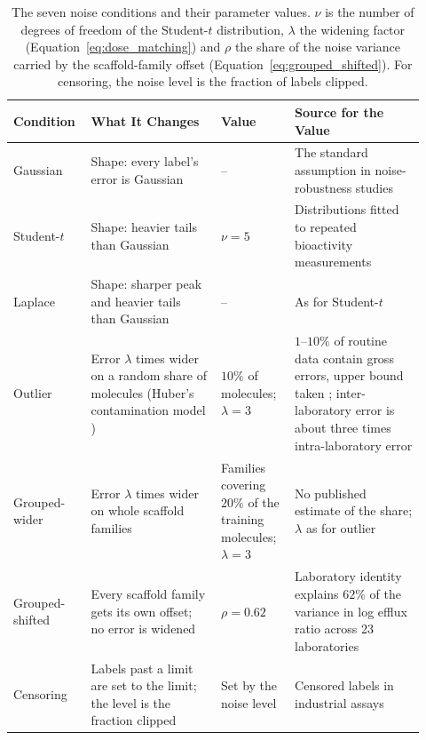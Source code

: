 \begin{table}[htbp]
\centering
\small
\begin{adjustbox}{max width=\textwidth,max totalheight=0.78\textheight}
\begin{tabular}{@{}P{0.15\linewidth}P{0.30\linewidth}P{0.17\linewidth}P{0.30\linewidth}@{}}
\toprule
\textbf{Condition} & \textbf{What It Changes} & \textbf{Value} & \textbf{Source for the Value} \\
\midrule
Gaussian & Shape: every label's error is Gaussian & -- & The standard assumption in noise-robustness studies \\
Student-$t$ & Shape: heavier tails than Gaussian & $\nu = 5$ & Distributions fitted to repeated bioactivity measurements \citep{Kruger2012} \\
Laplace & Shape: sharper peak and heavier tails than Gaussian & -- & As for Student-$t$ \citep{Kruger2012} \\
Outlier & Error $\lambda$ times wider on a random share of molecules (Huber's contamination model \citep{huber1964robust}) & $10\%$ of molecules; $\lambda = 3$ & $1$--$10\%$ of routine data contain gross errors, upper bound taken \citep{Hampel2001}; inter-laboratory error is about three times intra-laboratory error \citep{Avdeef2019} \\
Grouped-wider & Error $\lambda$ times wider on whole scaffold families & Families covering $20\%$ of the training molecules; $\lambda = 3$ & No published estimate of the share; $\lambda$ as for outlier \citep{Avdeef2019} \\
Grouped-shifted & Every scaffold family gets its own offset; no error is widened & $\rho = 0.62$ & Laboratory identity explains $62\%$ of the variance in log efflux ratio across 23 laboratories \citep{Bentz2013} \\
Censoring & Labels past a limit are set to the limit; the level is the fraction clipped & Set by the noise level & Censored labels in industrial assays \citep{Svensson2025} \\
\bottomrule
\end{tabular}
\end{adjustbox}
\caption[The seven noise conditions and their parameters.]{The seven noise conditions and their parameter values. $\nu$ is the number of degrees of freedom of the Student-$t$ distribution, $\lambda$ the widening factor (Equation~\ref{eq:dose_matching}) and $\rho$ the share of the noise variance carried by the scaffold-family offset (Equation~\ref{eq:grouped_shifted}). For censoring, the noise level is the fraction of labels clipped.}
\label{tab:noise_conditions}
\end{table}

